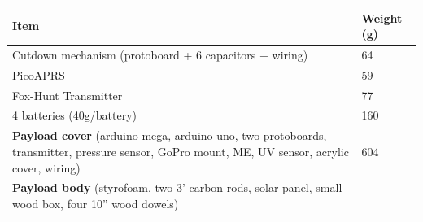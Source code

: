 \documentclass[12pt,]{article}
\begin{document}
\begin{longtable}[]{@{}ll@{}}
\toprule
\begin{minipage}[b]{0.72\columnwidth}\raggedright\strut
Item\strut
\end{minipage} & \begin{minipage}[b]{0.22\columnwidth}\raggedright\strut
Weight (g)\strut
\end{minipage}\tabularnewline
\midrule
\endhead
\begin{minipage}[t]{0.72\columnwidth}\raggedright\strut
Cutdown mechanism (protoboard + 6 capacitors + wiring)\strut
\end{minipage} & \begin{minipage}[t]{0.22\columnwidth}\raggedright\strut
64\strut
\end{minipage}\tabularnewline
\begin{minipage}[t]{0.72\columnwidth}\raggedright\strut
PicoAPRS\strut
\end{minipage} & \begin{minipage}[t]{0.22\columnwidth}\raggedright\strut
59\strut
\end{minipage}\tabularnewline
\begin{minipage}[t]{0.72\columnwidth}\raggedright\strut
Fox-Hunt Transmitter\strut
\end{minipage} & \begin{minipage}[t]{0.22\columnwidth}\raggedright\strut
77\strut
\end{minipage}\tabularnewline
\begin{minipage}[t]{0.72\columnwidth}\raggedright\strut
4 batteries (40g/battery)\strut
\end{minipage} & \begin{minipage}[t]{0.22\columnwidth}\raggedright\strut
160\strut
\end{minipage}\tabularnewline
\begin{minipage}[t]{0.72\columnwidth}\raggedright\strut
\textbf{Payload cover} (arduino mega, arduino uno, two protoboards,
transmitter, pressure sensor, GoPro mount, ME, UV sensor, acrylic cover,
wiring)\strut
\end{minipage} & \begin{minipage}[t]{0.22\columnwidth}\raggedright\strut
604\strut
\end{minipage}\tabularnewline
\begin{minipage}[t]{0.72\columnwidth}\raggedright\strut
\textbf{Payload body} (styrofoam, two 3' carbon rods, solar panel, small
wood box, four 10'' wood dowels)\strut
\end{minipage} & \begin{minipage}[t]{0.22\columnwidth}\raggedright\strut

\end{minipage}
\end{longtable}
\end{document}
